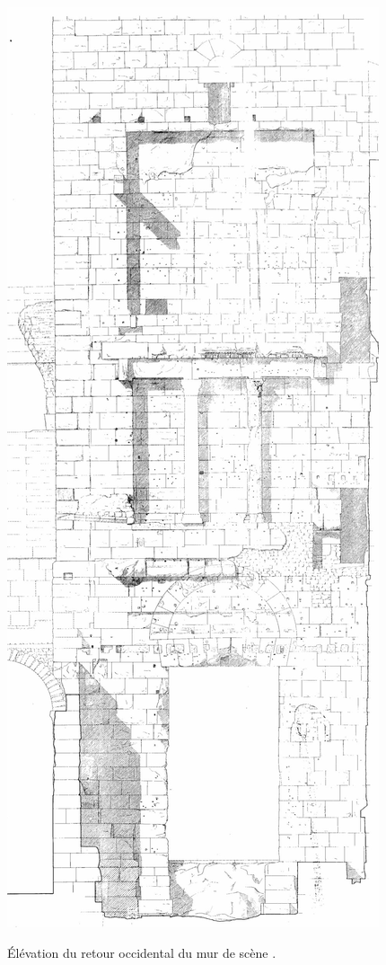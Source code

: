 \begin{figureth}
	\includegraphics[height=0.8\paperheight]{images/retourOccidentalMur}
	\caption[Elévation du retour du mur de scène]{Élévation du retour occidental du mur de scène \footnotemark.}
	\label{retourmur} 
\end{figureth}
\newpage



